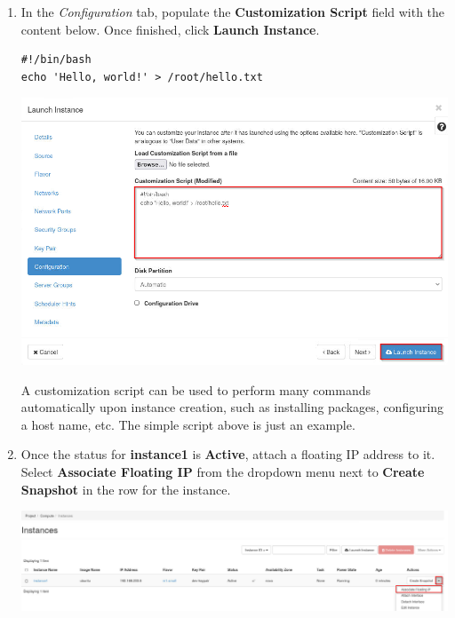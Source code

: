 \documentclass[letterpaper, 12pt]{article}
\begin{document}
\begin{enumerate}
    \item In the \textit{Configuration} tab, populate the \textbf{Customization Script} field with the content below.
    Once finished, click \textbf{Launch Instance}.
\begin{lstlisting}
#!/bin/bash
echo 'Hello, world!' > /root/hello.txt
\end{lstlisting}

    \begin{center}
        \includegraphics[width=\linewidth]{images/part1/step26.png}
    \end{center}

    \begin{tipbox}{}
        A customization script can be used to perform many commands automatically upon instance creation, such as
        installing packages, configuring a host name, etc. The simple script above is just an example.
    \end{tipbox}

    \item Once the status for \textbf{instance1} is \textbf{Active}, attach a floating IP address to it. Select
    \textbf{Associate Floating IP} from the dropdown menu next to \textbf{Create Snapshot} in the row for the instance.

    \begin{center}
        \includegraphics[width=\linewidth]{images/part1/step27.png}
    \end{center}


\end{enumerate}
\end{document}
